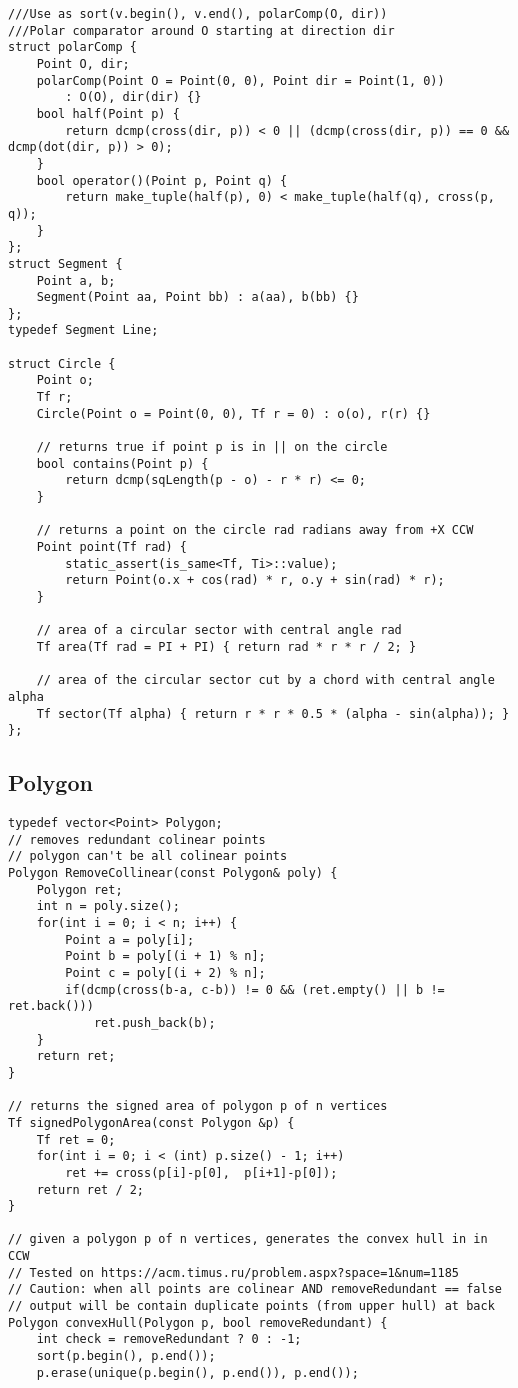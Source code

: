 \documentclass[FSZ,a4paper,onesided]{article}
\begin{document}
\begin{multicols*}{\COLS}
\begin{lstlisting}
///Use as sort(v.begin(), v.end(), polarComp(O, dir))
///Polar comparator around O starting at direction dir
struct polarComp {
    Point O, dir;
    polarComp(Point O = Point(0, 0), Point dir = Point(1, 0))
        : O(O), dir(dir) {}
    bool half(Point p) {
        return dcmp(cross(dir, p)) < 0 || (dcmp(cross(dir, p)) == 0 && dcmp(dot(dir, p)) > 0);
    }
    bool operator()(Point p, Point q) {
        return make_tuple(half(p), 0) < make_tuple(half(q), cross(p, q));
    }
};
struct Segment {
    Point a, b;
    Segment(Point aa, Point bb) : a(aa), b(bb) {}
};
typedef Segment Line;
 
struct Circle {
    Point o;
    Tf r;
    Circle(Point o = Point(0, 0), Tf r = 0) : o(o), r(r) {}
 
    // returns true if point p is in || on the circle
    bool contains(Point p) {
        return dcmp(sqLength(p - o) - r * r) <= 0;
    }
 
    // returns a point on the circle rad radians away from +X CCW
    Point point(Tf rad) {
        static_assert(is_same<Tf, Ti>::value);
        return Point(o.x + cos(rad) * r, o.y + sin(rad) * r);
    }
 
    // area of a circular sector with central angle rad
    Tf area(Tf rad = PI + PI) { return rad * r * r / 2; }
 
    // area of the circular sector cut by a chord with central angle alpha
    Tf sector(Tf alpha) { return r * r * 0.5 * (alpha - sin(alpha)); }
};\end{lstlisting}
\subsection{Polygon}
\begin{lstlisting}
typedef vector<Point> Polygon;
// removes redundant colinear points
// polygon can't be all colinear points
Polygon RemoveCollinear(const Polygon& poly) {
    Polygon ret;
    int n = poly.size();
    for(int i = 0; i < n; i++) {
        Point a = poly[i];
        Point b = poly[(i + 1) % n];
        Point c = poly[(i + 2) % n];
        if(dcmp(cross(b-a, c-b)) != 0 && (ret.empty() || b != ret.back()))
            ret.push_back(b);
    }
    return ret;
}

// returns the signed area of polygon p of n vertices
Tf signedPolygonArea(const Polygon &p) {
    Tf ret = 0;
    for(int i = 0; i < (int) p.size() - 1; i++)
        ret += cross(p[i]-p[0],  p[i+1]-p[0]);
    return ret / 2;
}

// given a polygon p of n vertices, generates the convex hull in in CCW
// Tested on https://acm.timus.ru/problem.aspx?space=1&num=1185
// Caution: when all points are colinear AND removeRedundant == false
// output will be contain duplicate points (from upper hull) at back
Polygon convexHull(Polygon p, bool removeRedundant) {
    int check = removeRedundant ? 0 : -1;
    sort(p.begin(), p.end());
    p.erase(unique(p.begin(), p.end()), p.end());


\end{lstlisting}
\end{multicols*}
\end{document}
